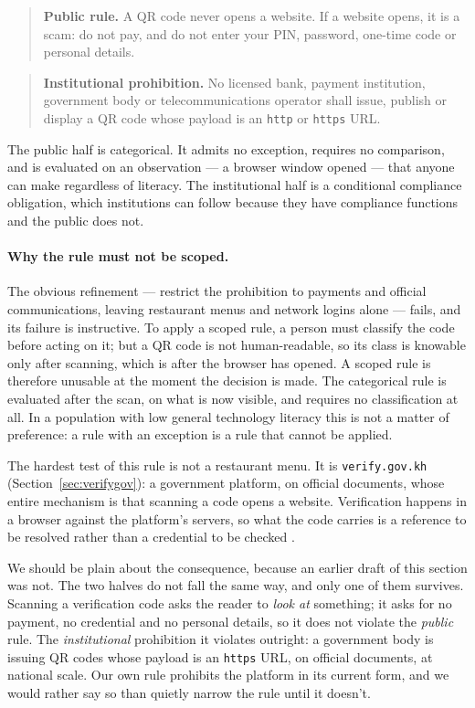 \documentclass[10pt,a4paper,twocolumn]{article}
\newcommand{\code}[1]{\texttt{\small #1}}
\begin{document}
\begin{quote}
\textbf{Public rule.} A QR code never opens a website. If a website opens, it is
a scam: do not pay, and do not enter your PIN, password, one-time code or
personal details.
\end{quote}

\begin{quote}
\textbf{Institutional prohibition.} No licensed bank, payment institution,
government body or telecommunications operator shall issue, publish or display a
QR code whose payload is an \code{http} or \code{https} URL.
\end{quote}

The public half is categorical. It admits no exception, requires no comparison,
and is evaluated on an observation --- a browser window opened --- that anyone can
make regardless of literacy. The institutional half is a conditional compliance
obligation, which institutions can follow because they have compliance
functions and the public does not.

\paragraph{Why the rule must not be scoped.}
The obvious refinement --- restrict the prohibition to payments and official
communications, leaving restaurant menus and network logins alone --- fails, and
its failure is instructive. To apply a scoped rule, a person must classify the
code before acting on it; but a QR code is not human-readable, so its class is
knowable only after scanning, which is after the browser has opened. A scoped
rule is therefore unusable at the moment the decision is made. The categorical
rule is evaluated after the scan, on what is now visible, and requires no
classification at all. In a population with low general technology literacy this
is not a matter of preference: a rule with an exception is a rule that cannot be
applied.

The hardest test of this rule is not a restaurant menu. It is
\code{verify.gov.kh} (Section~\ref{sec:verifygov}): a government platform, on
official documents, whose entire mechanism is that scanning a code opens a
website. Verification happens in a browser against the platform's servers, so
what the code carries is a reference to be resolved rather than a credential to
be checked \citep{verifygovkh}.

We should be plain about the consequence, because an earlier draft of this
section was not. The two halves do not fall the same way, and only one of them
survives. Scanning a verification code asks the reader to \emph{look at}
something; it asks for no payment, no credential and no personal details, so it
does not violate the \emph{public} rule. The \emph{institutional} prohibition it
violates outright: a government body is issuing QR codes whose payload is an
\code{https} URL, on official documents, at national scale. Our own rule prohibits
the platform in its current form, and we would rather say so than quietly narrow
the rule until it doesn't.
\end{document}
